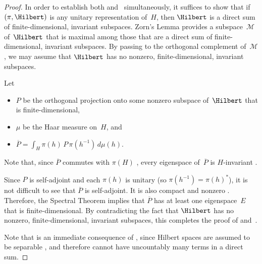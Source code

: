\begin{proof}
In order to establish both  and~ simultaneously, it suffices to show that if $(\pi,\Hilbert)$ is any unitary representation of~$H$, then $\Hilbert$ is a direct sum of finite-dimensional, invariant subspaces.
Zorn's Lemma  provides a subspace~$\mathcal{M}$ of~$\Hilbert$ that is maximal among those that are a direct sum of finite-dimensional, invariant subspaces. By passing to the orthogonal complement of~$\mathcal{M}$, we may assume that $\Hilbert$ has no nonzero, finite-dimensional, invariant subspaces.

Let 
\noprelistbreak
	\begin{itemize}
	\item $P$ be the orthogonal projection onto some nonzero subspace of~$\Hilbert$ that is finite-dimensional, 
	\item $\mu$ be the Haar measure on~$H$,
	and
	\item $ \overline{P} = \int_H \pi(h) \, P \, \pi(h^{-1}) \, d\mu(h)$.
	\end{itemize}
Note that, since $\overline{P}$ commutes with $\pi(H)$ , every eigenspace of~$\overline{P}$ is $H$-invariant . 

Since $P$ is self-adjoint and each $\pi(h)$ is unitary (so $\pi(h^{-1}) = \pi(h)^*$), it is not difficult to see that $\overline{P}$ is self-adjoint. It is also compact  and nonzero . Therefore, the Spectral Theorem  implies that $\overline{P}$ has at least one eigenspace~$E$ that is finite-dimensional. By contradicting the fact that $\Hilbert$ has no nonzero, finite-dimensional, invariant subspaces, this completes the proof of  and~.

\medbreak

Note that  is an immediate consequence of , since Hilbert spaces are assumed to be separable , and therefore cannot have uncountably many terms in a direct sum.

\medbreak


\end{proof}
